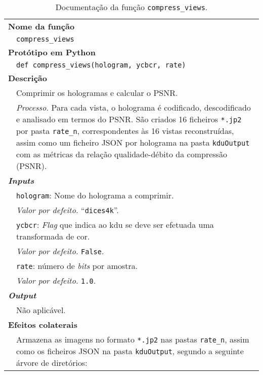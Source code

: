 \begin{table}[!hp]
    \centering
    \caption{Documentação da função \texttt{compress\_views}.}
    \label{tab:compress_views}
    \begin{tabular}{p{1cm} p{11.5cm}}
        \hline
        \multicolumn{2}{l}{\bfseries\small Nome da função}\\
         & \verb|compress_views|\\
        \hline
        \multicolumn{2}{l}{\bfseries\small Protótipo em Python}\\
         & \texttt{def compress_views(hologram, ycbcr, rate)} \\
        \hline\multicolumn{2}{l}{\bfseries\small Descrição}\\
         & Comprimir os hologramas e calcular o \ac{PSNR}. \\
         & \textit{Processo.} Para cada vista, o holograma é codificado, descodificado e analisado em termos do \ac{PSNR}. São criados 16 ficheiros \verb|*.jp2| por pasta \verb|rate_n|, correspondentes às 16 vistas reconstruídas, assim como um ficheiro \ac{JSON} por holograma na pasta \verb|kduOutput| com as métricas da relação qualidade-débito da compressão (\ac{PSNR}). \\
        \hline\multicolumn{2}{l}{\bfseries\small \textit{Inputs}}\\
         & \verb|hologram|: Nome do holograma a comprimir.\\
         & \hspace{1cm} \textit{Valor por defeito.} ``\verb|dices4k|''.\\
         & \verb|ycbcr|: \textit{Flag} que indica ao \ac{kdu} se deve ser efetuada uma transformada de cor.\\
         & \hspace{1cm} \textit{Valor por defeito.} \verb|False|.\\
         & \verb|rate|: número de \textit{bits} por amostra.\\
         & \hspace{1cm} \textit{Valor por defeito.} \verb|1.0|.\\
        \hline\multicolumn{2}{l}{\bfseries\small \textit{Output}}\\
         & Não aplicável.\\
        \hline\multicolumn{2}{l}{\bfseries\small Efeitos colaterais}\\
         & Armazena as imagens no formato \verb|*.jp2| nas pastas \verb|rate_n|, assim como os ficheiros \ac{JSON} na pasta \verb|kduOutput|, segundo a seguinte árvore de diretórios:\\

\end{tabular}
\end{table}
